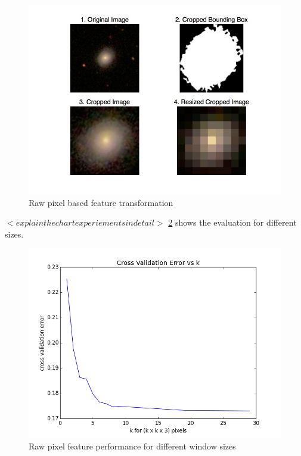 \documentclass[10pt]{article}
\begin{document}
\begin{figure}[h]
\begin{center}
\includegraphics[scale=0.4]{images/hand_engineered_features.jpg}
\caption{Raw pixel based feature transformation}
\end{center}
\label{fig:raw}
\end{figure}

$<explain the chart experiements in detail>$ \ref{fig:raweval} shows the evaluation for different sizes.

\begin{figure}[h]
\begin{center}
\includegraphics[scale=0.4]{images/find_k_cv.jpg}
\caption{Raw pixel feature performance for different window sizes}
\end{center}
\label{fig:raweval}
\end{figure}
\end{document}
